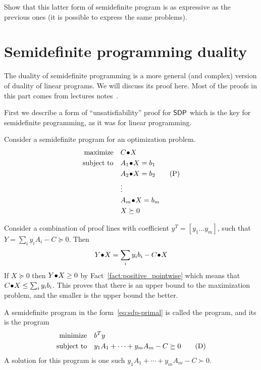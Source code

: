 \documentclass[a4paper,twoside,justified]{tufte-handout}
\begin{document}
\begin{exercise}
  Show that this latter form of semidefinite program is as expressive
  as the previous ones (\ie it is possible to express the same
  problems).
\end{exercise}

\section{Semidefinite programming duality}

The duality of semidefinite programming is a more general (and
complex) version of duality of linear programs. We will discuss its
proof here. Most of the proofs in this part comes from \Lovasz
lectures notes~\cite{lovasz2003semidefinite}.


First we describe a form of ``unsatisfiability'' proof for $ \mathsf{SDP} $
which is the key for semidefinite programming, as it was for linear
programming.

Consider a semidefinite program for an optimization problem. 
\begin{alignat}{2}
  \maximize \pointwiseprod{C}{X} \notag\\
  \subjectto \pointwiseprod{A_{1}}{X} = b_{1} \notag\\
  & \pointwiseprod{A_{2}}{X} = b_{2} \label{eq:sdp-primal}\tag{P}\\
  & \vdots \notag\\
  & \pointwiseprod{A_{m}}{X} = b_{m} \notag\\
  & X \succeq 0 \notag
\end{alignat}

Consider a combination of proof lines with coefficient $ y^{T}=
[y_{1}\ldots y_{m}]$, such that $ Y= \sum_{i}y_{i}A_{i} - C \succeq
0$. Then 
\begin{equation}
 {Y}\!\bullet\!{X}=\sum_{i}y_{i}b_{i} -{C}\!\bullet\!{X} 
\end{equation}
If $ X \succeq 0 $ then ${Y}\!\bullet\!{X} \geq 0$ by
Fact~\ref{fact:positive_pointwise} which means that $
{C}\!\bullet\!{X} \leq \sum_{i}y_{i}b_{i} $. This proves that there
is an upper bound to the maximization problem, and the smaller is the
upper bound the better.

\begin{definition}
  A semidefinite program in the form~\eqref{eq:sdp-primal} is called
  the  program, and its  is the program
  \begin{alignat}{2}
    \minimize  b^{T}y \notag \\
    \subjectto  y_{1}A_{1}+\cdots+y_{m}A_{m} -C \succeq
    0 \label{eq:sdp-dual} \tag{D}
  \end{alignat}
  A  solution for this program is one
  such  $  y_{1}A_{1}+\cdots+y_{m}A_{m} -C \succ 0 $.
\end{definition}
\end{document}
